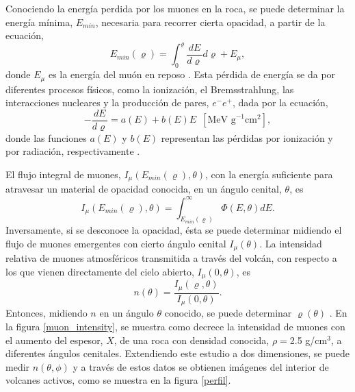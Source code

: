 \documentclass[12pt,oneside,openany,letter]{book}
\begin{document}
Conociendo la energ\'ia perdida por los muones en la roca, se puede determinar la energ\'ia m\'inima, $E_{min}$, necesaria para recorrer cierta opacidad, a partir de la ecuaci\'on,
\begin{equation}
E_{min}(\varrho)=\int^{\varrho}_{0} \frac{dE}{d\varrho} d\varrho +E_{\mu},
\end{equation}
donde $E_{\mu}$ es la energ\'ia del mu\'on en reposo \cite{lesparre-etal2010}. Esta p\'erdida de energía se da por diferentes procesos físicos, como la ionizaci\'on, el Bremsstrahlung, las interacciones nucleares y la producción de pares, $e^-e^+$, dada por la ecuaci\'on, 
\begin{equation}
- \dfrac{d E}{d \varrho} = a(E)+b(E)E \,\,\, [\text{MeV g}^{-1}\text{cm}^2],
\end{equation}
donde las funciones $a(E)$ y $b(E)$ representan las p\'erdidas por ionizaci\'on y por radiaci\'on, respectivamente \cite{Marteau-etal2012}. 

El flujo integral de muones, $I_{\mu}(E_{min}(\varrho), \theta)$, con la energía suficiente para atravesar un material de opacidad conocida, en un ángulo cenital, $\theta$, es 
\begin{equation}
I_{\mu}(E_{min}(\varrho), \theta)=\int_{E_{min}(\varrho)}^{\infty}\Phi(E,\theta)dE.
\end{equation}
Inversamente, si se desconoce la opacidad, ésta se puede determinar midiendo el flujo de muones emergentes con cierto ángulo cenital $I_{\mu}(\theta)$. La intensidad relativa de muones atmosféricos transmitida a través del volcán, con respecto a los que vienen directamente del cielo abierto, ${I_{\mu}(0, \theta)}$, es
\begin{equation}
n(\theta) = \frac{I_{\mu}(\varrho, \theta)}{I_{\mu}(0, \theta)}.
\end{equation}
Entonces, midiendo $n$ en un \'angulo $\theta$ conocido, se puede determinar $\varrho(\theta)$ \cite{nagamine_2003}. En la figura \ref{muon_intensity}, se muestra como decrece la intensidad de muones con el aumento del espesor, $X$, de una roca con densidad conocida, $\rho=$2.5 g/cm$^3$, a diferentes \'angulos cenitales. Extendiendo este estudio a dos dimensiones, se puede medir $n(\theta, \phi)$ y a través de estos datos se obtienen imágenes del interior de volcanes activos, como se muestra en la figura \ref{perfil}.
\end{document}
